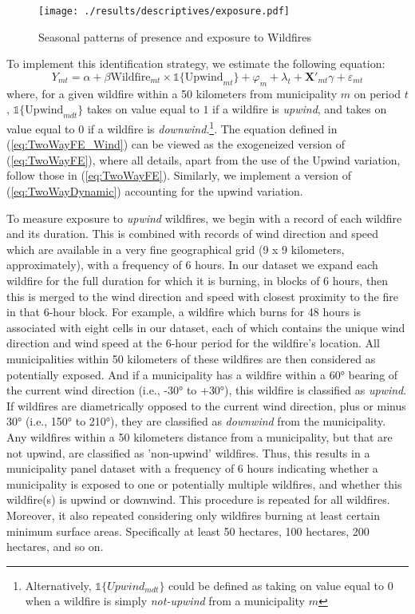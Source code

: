 \documentclass[11pt]{article}
\begin{document}
\begin{spacing}{1.3}
\begin{figure}
    \centering
    \texttt{[image: ./results/descriptives/exposure.pdf]}
    \caption{Seasonal patterns of presence and exposure to Wildfires}
    \label{fig:time}
\end{figure}    


To implement this identification strategy, we estimate the following equation:
\begin{equation}
\label{eq:TwoWayFE_Wind}
Y_{mt}=\alpha + \beta\text{Wildfire}_{mt}\times\mathds{1}\{\text{Upwind}_{mt}\} + \varphi_{m} + \lambda_t + \bm{X}'_{mt}\gamma + \varepsilon_{mt}
\end{equation}
where, for a given wildfire within a 50 kilometers from municipality $m$ on period $t$, $\mathds{1}\{\text{Upwind}_{mdt}\}$ takes on value equal to $1$ if a wildfire is \textit{upwind}, and takes on value equal to $0$ if a wildfire is \textit{downwind}.\footnote{Alternatively,  $\mathds{1}\{Upwind_{mdt}\}$ could be defined as taking on value equal to $0$ when a wildfire is simply \textit{not-upwind} from a municipality $m$}.  The equation defined in (\ref{eq:TwoWayFE_Wind}) can be viewed as the exogeneized version of (\ref{eq:TwoWayFE}), where all details, apart from the use of the Upwind variation, follow those in (\ref{eq:TwoWayFE}). Similarly, we implement a version of (\ref{eq:TwoWayDynamic}) accounting for the upwind variation.

To measure exposure to \textit{upwind} wildfires, we begin with a record of each wildfire and its duration.  This is combined with records of wind direction and speed which are available in a very fine geographical grid (9 x 9 kilometers, approximately), with a frequency of 6 hours. In our dataset we expand each wildfire for the full duration for which it is burning, in blocks of 6 hours, then this is merged to the wind direction and speed with closest proximity to the fire in that 6-hour block.  For example, a wildfire which burns for 48 hours is associated with eight cells in our dataset, each of which contains the unique wind direction and wind speed at the 6-hour period for the wildfire's location.  All municipalities within 50 kilometers of these wildfires are then considered as potentially exposed. And if a municipality has a wildfire within a 60° bearing of the current wind direction (i.e., -30° to +30°), this wildfire is classified as \textit{upwind}.  If wildfires are diametrically opposed to the current wind direction, plus or minus 30° (i.e., 150° to 210°), they are classified as \textit{downwind} from the municipality.  Any wildfires within a 50 kilometers distance from a municipality,  but that are not upwind, are classified as 'non-upwind' wildfires.  Thus, this results in a municipality panel dataset with a frequency of 6 hours indicating whether a municipality is exposed to one or potentially multiple wildfires, and whether this wildfire(s) is upwind or downwind.  This procedure is repeated for all wildfires. Moreover, it also repeated considering only wildfires burning at least certain minimum surface areas. Specifically at least 50 hectares, 100 hectares, 200 hectares, and so on.


\end{spacing}
\end{document}
